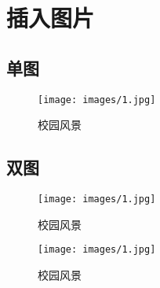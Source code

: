 \documentclass[12pt,a4paper]{article}%
\begin{document}
    \section{插入图片}
    \subsection{单图}
    \begin{figure}[H]%
	\centering
	\begin{minipage}{0.83\textwidth}%
		\centering
		\texttt{[image: images/1.jpg]}%
		\caption{\fontsize{10pt}{15pt}\selectfont 校园风景}%
        \label{fig:1}
	\end{minipage}
    \end{figure}

    \subsection{双图}
    \begin{figure}[H]%
            
    	\centering
    	\begin{minipage}{0.48\textwidth}
    		\centering
    		\texttt{[image: images/1.jpg]}
    		\caption{\fontsize{10pt}{15pt}\selectfont 校园风景}
    	\end{minipage}
    	\hspace{0cm}%
    	\hfill%
    	\begin{minipage}{0.48\textwidth}
    		\centering
    		\texttt{[image: images/1.jpg]}
    		\caption{\fontsize{10pt}{15pt}\selectfont 校园风景}
    	\end{minipage}
    \end{figure}
    
\end{document}

